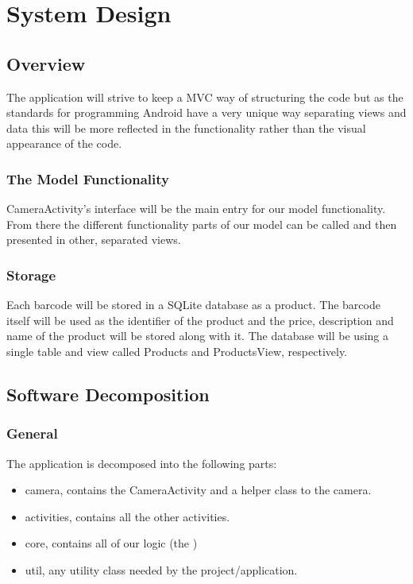 \documentclass{report}
\begin{document}
\chapter{System Design}

\section{Overview}
The application will strive to keep a MVC way of structuring the code but as the standards for programming Android have a very unique way separating views and data this will be more reflected in the functionality rather than the visual appearance of the code.

\subsection{The Model Functionality}
CameraActivity's interface will be the main entry for our model functionality. From there the different functionality parts of our model can be called and then presented in other, separated views.

\subsection{Storage}
Each barcode will be stored in a SQLite database as a product. The barcode itself will be used as the identifier of the product and the price, description and name of the product will be stored along with it. The database will be using a single table and view called Products and ProductsView, respectively.

\pagebreak

\section{Software Decomposition}

\subsection{General}

The application is decomposed into the following parts:

\begin{itemize}
  \item{camera}, contains the CameraActivity and a helper class to the camera.
  \item{activities}, contains all the other activities.
  \item{core}, contains all of our logic (the )
  \item{util}, any utility class needed by the project/application.
\end{itemize}
\end{document}
